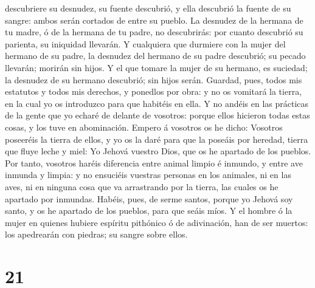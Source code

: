 descubriere su desnudez, su fuente descubrió, y ella descubrió la fuente
de su sangre: ambos serán cortados de entre su pueblo.  La
desnudez de la hermana de tu madre, ó de la hermana de tu padre, no
descubrirás: por cuanto descubrió su parienta, su iniquidad llevarán.
 Y cualquiera que durmiere con la mujer del hermano de su
padre, la desnudez del hermano de su padre descubrió; su pecado
llevarán; morirán sin hijos.  Y el que tomare la mujer de
su hermano, es suciedad; la desnudez de su hermano descubrió; sin hijos
serán.  Guardad, pues, todos mis estatutos y todos mis
derechos, y ponedlos por obra: y no os vomitará la tierra, en la cual yo
os introduzco para que habitéis en ella.  Y no andéis en
las prácticas de la gente que yo echaré de delante de vosotros: porque
ellos hicieron todas estas cosas, y los tuve en abominación.
 Empero á vosotros os he dicho: Vosotros poseeréis la
tierra de ellos, y yo os la daré para que la poseáis por heredad, tierra
que fluye leche y miel: Yo Jehová vuestro Dios, que os he apartado de
los pueblos.  Por tanto, vosotros haréis diferencia entre
animal limpio é inmundo, y entre ave inmunda y limpia: y no ensuciéis
vuestras personas en los animales, ni en las aves, ni en ninguna cosa
que va arrastrando por la tierra, las cuales os he apartado por
inmundas.  Habéis, pues, de serme santos, porque yo Jehová
soy santo, y os he apartado de los pueblos, para que seáis míos.
 Y el hombre ó la mujer en quienes hubiere espíritu
pithónico ó de adivinación, han de ser muertos: los apedrearán con
piedras; su sangre sobre ellos.

\hypertarget{section-20}{%
\section{21}\label{section-20}}

